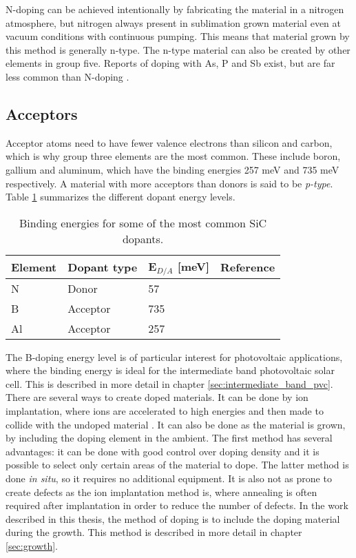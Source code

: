 N-doping can be achieved intentionally by fabricating the material in a nitrogen atmosphere, but nitrogen always present in sublimation grown material even at vacuum conditions with continuous pumping\cite{Sun2012b}. This means that material grown by this method is generally n-type. The n-type material can also be created by other elements in group five. Reports of doping with As, P and Sb exist, but are far less common than N-doping \cite{Rao1999}. 

\subsection{Acceptors}
Acceptor atoms need to have fewer valence electrons than silicon and carbon, which is why group three elements are the most common. These include boron, gallium and aluminum, which have the binding energies 257 meV \cite{Freitas1988} and 735 meV \cite{Richards2003} respectively. A material with more acceptors than donors is said to be \emph{p-type}. Table \ref{tab:dopants} summarizes the different dopant energy levels. 

\begin{table}[h]
\caption{Binding energies for some of the most common SiC dopants.}
\label{tab:dopants}
\begin{center}
\begin{tabular}{ l l l r}
  \hline                       
  \hline       
  \vspace{1mm}
    Element  & Dopant type & E$_{D/A}$ [meV] & Reference\\
    \hline
  N &  Donor & 57 & \cite{Freitas1988}\\
  B &  Acceptor & 735 & \cite{Richards2003}\\
  Al &  Acceptor & 257  & \cite{Freitas1988}\\
  \hline  
\end{tabular}
\end{center}
\end{table}

The B-doping energy level is of particular interest for photovoltaic applications, where the binding energy is ideal for the intermediate band photovoltaic solar cell. This is described in more detail in chapter \ref{sec:intermediate_band_pvc}. 
\\ 

\noindent 
There are several ways to create doped materials. It can be done by ion implantation, where ions are accelerated to high energies and then made to collide with the undoped material \cite{Rao1999}. It can also be done as the material is grown, by including the doping element in the ambient. The first method has several advantages: it can be done with good control over doping density and it is possible to select only certain areas of the material to dope. The latter method is done \emph{in situ}, so it requires no additional equipment. It is also not as prone to create defects as the ion implantation method is, where annealing is often required after implantation in order to reduce the number of defects. In the work described in this thesis, the method of doping is to include the doping material during the growth. This method is described in more detail in chapter \ref{sec:growth}. 

